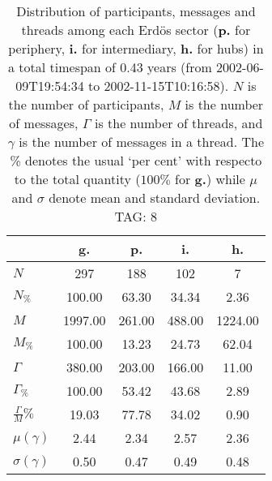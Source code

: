 \begin{table}[h!]
\begin{center}
\begin{tabular}{| l | c | c | c | c |}\hline
 & g. & p. & i. & h. \\\hline
$N$ & 297  & 188  & 102  & 7 \\\hline
$N_{\%}$ & 100.00  & 63.30  & 34.34  & 2.36 \\\hline
$M$ & 1997.00  & 261.00  & 488.00  & 1224.00 \\\hline
$M_{\%}$ & 100.00  & 13.23  & 24.73  & 62.04 \\\hline
$\Gamma$ & 380.00  & 203.00  & 166.00  & 11.00 \\\hline
$\Gamma_{\%}$ & 100.00  & 53.42  & 43.68  & 2.89 \\\hline
$\frac{\Gamma}{M}\%$ & 19.03  & 77.78  & 34.02  & 0.90 \\\hline
$\mu(\gamma)$ & 2.44  & 2.34  & 2.57  & 2.36 \\\hline
$\sigma(\gamma)$ & 0.50  & 0.47  & 0.49  & 0.48 \\\hline
\end{tabular}
\caption{Distribution of participants, messages and threads among each Erd\"os sector ({\bf p.} for periphery, {\bf i.} for intermediary, 
    {\bf h.} for hubs) in a total timespan of 0.43 years (from 2002-06-09T19:54:34 to 2002-11-15T10:16:58). $N$ is the number of participants, $M$ is the number of messages, $\Gamma$ is the number of threads, and $\gamma$ is the number of messages in a thread.
    The \% denotes the usual `per cent' with respecto to the total quantity ($100\%$ for {\bf g.})
    while $\mu$ and $\sigma$ denote mean and standard deviation. TAG: 8}
\end{center}
\end{table}